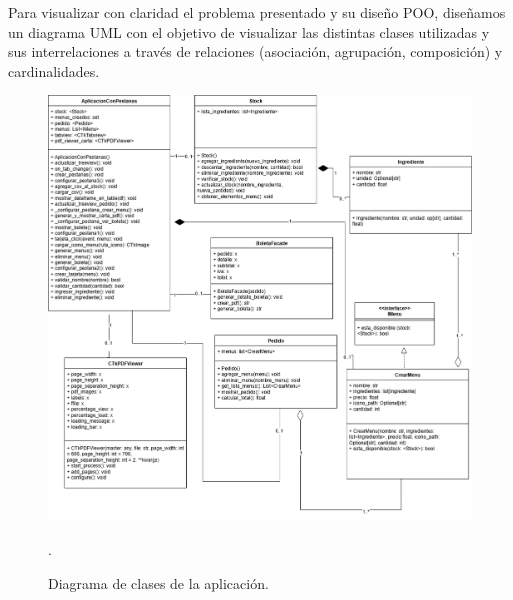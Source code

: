 \documentclass[a4paper,12pt]{article}
\begin{document}
Para visualizar con claridad el problema presentado y su diseño POO, diseñamos un diagrama UML con el objetivo de visualizar las distintas clases utilizadas y sus interrelaciones a través de relaciones (asociación, agrupación, composición) y cardinalidades.

\begin{figure}[H]
    \centering
    \includegraphics[width=1.1\textwidth]{Diagrama-Restaurante.drawio.png}
    \caption{Diagrama de clases de la aplicación.}.
\end{figure}
\end{document}
